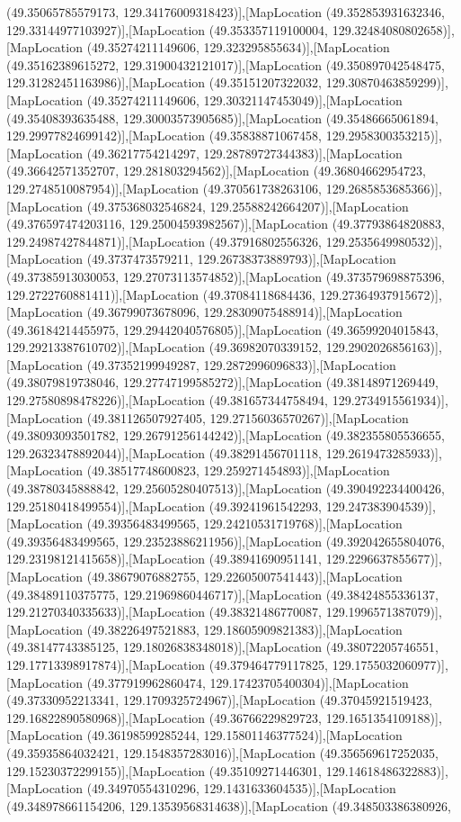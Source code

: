 (49.35065785579173, 129.34176009318423)],[MapLocation (49.352853931632346, 129.33144977103927)],[MapLocation (49.353357119100004, 129.32484080802658)],[MapLocation (49.35274211149606, 129.323295855634)],[MapLocation (49.35162389615272, 129.31900432121017)],[MapLocation (49.350897042548475, 129.31282451163986)],[MapLocation (49.35151207322032, 129.30870463859299)],[MapLocation (49.35274211149606, 129.30321147453049)],[MapLocation (49.35408393635488, 129.30003573905685)],[MapLocation (49.35486665061894, 129.29977824699142)],[MapLocation (49.35838871067458, 129.2958300353215)],[MapLocation (49.36217754214297, 129.28789727344383)],[MapLocation (49.36642571352707, 129.281803294562)],[MapLocation (49.36804662954723, 129.2748510087954)],[MapLocation (49.370561738263106, 129.2685853685366)],[MapLocation (49.375368032546824, 129.25588242664207)],[MapLocation (49.376597474203116, 129.25004593982567)],[MapLocation (49.37793864820883, 129.24987427844871)],[MapLocation (49.37916802556326, 129.2535649980532)],[MapLocation (49.3737473579211, 129.26738373889793)],[MapLocation (49.37385913030053, 129.27073113574852)],[MapLocation (49.373579698875396, 129.2722760881411)],[MapLocation (49.37084118684436, 129.27364937915672)],[MapLocation (49.36799073678096, 129.28309075488914)],[MapLocation (49.36184214455975, 129.29442040576805)],[MapLocation (49.36599204015843, 129.29213387610702)],[MapLocation (49.36982070339152, 129.2902026856163)],[MapLocation (49.37352199949287, 129.2872996096833)],[MapLocation (49.38079819738046, 129.27747199585272)],[MapLocation (49.38148971269449, 129.27580898478226)],[MapLocation (49.381657344758494, 129.2734915561934)],[MapLocation (49.381126507927405, 129.27156036570267)],[MapLocation (49.38093093501782, 129.26791256144242)],[MapLocation (49.382355805536655, 129.26323478892044)],[MapLocation (49.38291456701118, 129.2619473285933)],[MapLocation (49.38517748600823, 129.259271454893)],[MapLocation (49.38780345888842, 129.25605280407513)],[MapLocation (49.390492234400426, 129.25180418499554)],[MapLocation (49.39241961542293, 129.247383904539)],[MapLocation (49.39356483499565, 129.24210531719768)],[MapLocation (49.39356483499565, 129.23523886211956)],[MapLocation (49.392042655804076, 129.23198121415658)],[MapLocation (49.38941690951141, 129.2296637855677)],[MapLocation (49.38679076882755, 129.22605007541443)],[MapLocation (49.38489110375775, 129.21969860446717)],[MapLocation (49.38424855336137, 129.21270340335633)],[MapLocation (49.38321486770087, 129.1996571387079)],[MapLocation (49.38226497521883, 129.18605909821383)],[MapLocation (49.38147743385125, 129.18026838348018)],[MapLocation (49.38072205746551, 129.17713398917874)],[MapLocation (49.379464779117825, 129.1755032060977)],[MapLocation (49.377919962860474, 129.17423705400304)],[MapLocation (49.37330952213341, 129.1709325724967)],[MapLocation (49.37045921519423, 129.16822890580968)],[MapLocation (49.36766229829723, 129.1651354109188)],[MapLocation (49.36198599285244, 129.15801146377524)],[MapLocation (49.35935864032421, 129.1548357283016)],[MapLocation (49.356569617252035, 129.15230372299155)],[MapLocation (49.35109271446301, 129.14618486322883)],[MapLocation (49.34970554310296, 129.1431633604535)],[MapLocation (49.348978661154206, 129.13539568314638)],[MapLocation (49.348503386380926, 